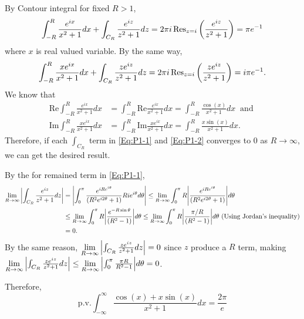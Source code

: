 \documentclass{article}
\begin{document}
By Contour integral for fixed $R>1$,
\begin{equation}\label{Eq:P1-1}
\int_{-R}^R\frac{e^{ix}}{x^2+1}dx+\int_{C_R} \frac{e^{iz}}{z^2+1}dz=2\pi i \Res_{z=i} \left(\frac{e^{iz}}{z^2+1}\right)=\pi e^{-1}
\end{equation}
where $x$ is real valued variable. By the same way,
\begin{equation}\label{Eq:P1-2}
\int_{-R}^R \frac{xe^{ix}}{x^2+1}dx+\int_{C_R} \frac{ze^{iz}}{z^2+1}dz=2\pi i \Res_{z=i} \left(\frac{ze^{iz}}{z^2+1}\right)=i\pi e^{-1}.
\end{equation}
We know that
\begin{equation*}
\begin{split}
\text{Re}\int_{-R}^R\frac{e^{ix}}{x^2+1}dx&=\int_{-R}^R\text{Re}\frac{e^{ix}}{x^2+1}dx=\int_{-R}^R\frac{\cos(x)}{x^2+1}dx ~\text{ and } \\
\text{Im}\int_{-R}^R\frac{xe^{ix}}{x^2+1}dx&=\int_{-R}^R\text{Im}\frac{xe^{ix}}{x^2+1}dx=\int_{-R}^R\frac{x\sin(x)}{x^2+1}dx.
\end{split}
\end{equation*}
Therefore, if each $\int_{C_R}$ term in \eqref{Eq:P1-1} and \eqref{Eq:P1-2} converges to 0 as $R\rightarrow \infty$, we can get the desired result.

By the for remained term in \eqref{Eq:P1-1},
\begin{equation*}
\begin{split}
\lim\limits_{R\rightarrow \infty}\abs{\int_{C_R} \frac{e^{iz}}{z^2+1}dz}&=\abs{\int_0^\pi \frac{e^{iRe^{i\theta}}}{(R^2e^{i2\theta}+1)}Rie^{i\theta}d\theta}\leq \lim\limits_{R\rightarrow \infty} \int_0^\pi R\abs{\frac{e^{iRe^{i\theta}}}{(R^2e^{i2\theta}+1)}}d\theta \\
&\leq\lim\limits_{R\rightarrow \infty} \int_0^\pi R\abs{\frac{e^{-R\sin\theta}}{(R^2-1)}}d\theta\leq \lim\limits_{R\rightarrow \infty} \int_0^\pi R\abs{\frac{\pi/R}{(R^2-1)}}d\theta \text{ (Using Jordan's inequality)} \\
&=0.
\end{split}
\end{equation*}
By the same reason, $\lim\limits_{R\rightarrow \infty}\abs{\int_{C_R} \frac{ze^{iz}}{z^2+1}dz}=0$ since $z$ produce a $R$ term, making $\lim\limits_{R\rightarrow \infty}\abs{\int_{C_R} \frac{ze^{iz}}{z^2+1}dz}\leq \lim\limits_{R\rightarrow \infty}\abs{\int_0^\pi \frac{\pi R}{R^2-1}}d\theta=0$.

Therefore,
\begin{equation*}
\text{p.v.}\int_{-\infty}^\infty\frac{\cos(x)+x\sin(x)}{x^2+1}dx=\frac{2\pi}{e}
\end{equation*}
\end{document}
